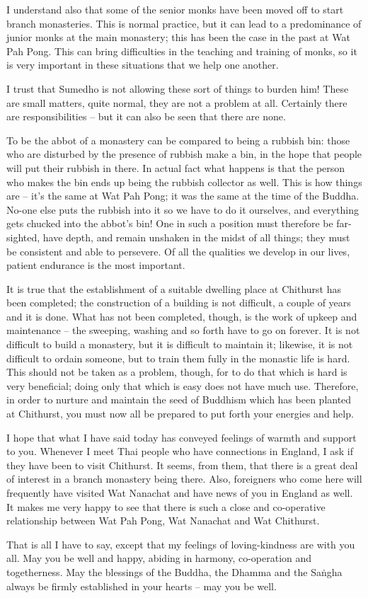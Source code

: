 I understand also that some of the senior monks have been moved off to start branch monasteries. This is normal practice, but it can lead to a predominance of junior monks at the main monastery; this has been the case in the past at Wat Pah Pong. This can bring difficulties in the teaching and training of monks, so it is very important in these situations that we help one another.

I trust that Sumedho is not allowing these sort of things to burden him! These are small matters, quite normal, they are not a problem at all. Certainly there are responsibilities -- but it can also be seen that there are none.

To be the abbot of a monastery can be compared to being a rubbish bin: those who are disturbed by the presence of rubbish make a bin, in the hope that people will put their rubbish in there. In actual fact what happens is that the person who makes the bin ends up being the rubbish collector as well. This is how things are -- it's the same at Wat Pah Pong; it was the same at the time of the Buddha. No-one else puts the rubbish into it so we have to do it ourselves, and everything gets chucked into the abbot's bin! One in such a position must therefore be far-sighted, have depth, and remain unshaken in the midst of all things; they must be consistent and able to persevere. Of all the qualities we develop in our lives, patient endurance is the most important.

It is true that the establishment of a suitable dwelling place at Chithurst has been completed; the construction of a building is not difficult, a couple of years and it is done. What has not been completed, though, is the work of upkeep and maintenance -- the sweeping, washing and so forth have to go on forever. It is not difficult to build a monastery, but it is difficult to maintain it; likewise, it is not difficult to ordain someone, but to train them fully in the monastic life is hard. This should not be taken as a problem, though, for to do that which is hard is very beneficial; doing only that which is easy does not have much use. Therefore, in order to nurture and maintain the seed of Buddhism which has been planted at Chithurst, you must now all be prepared to put forth your energies and help.

I hope that what I have said today has conveyed feelings of warmth and support to you. Whenever I meet Thai people who have connections in England, I ask if they have been to visit Chithurst. It seems, from them, that there is a great deal of interest in a branch monastery being there. Also, foreigners who come here will frequently have visited Wat Nanachat and have news of you in England as well. It makes me very happy to see that there is such a close and co-operative relationship between Wat Pah Pong, Wat Nanachat and Wat Chithurst.

That is all I have to say, except that my feelings of loving-kindness are with you all. May you be well and happy, abiding in harmony, co-operation and togetherness. May the blessings of the Buddha, the Dhamma and the Sa\.ngha always be firmly established in your hearts -- may you be well. 
